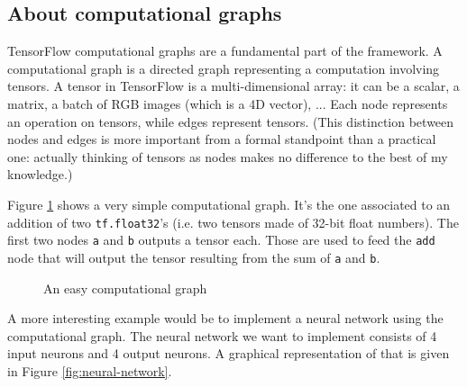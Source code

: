 \subsection{About computational graphs}
\label{subsec:computational-graph}

TensorFlow computational graphs are a fundamental part of the
framework. A computational graph is a directed graph representing a
computation involving tensors. A tensor in TensorFlow is a
multi-dimensional array: it can be a scalar, a matrix, a batch of RGB
images (which is a 4D vector), ... Each node represents an operation on
tensors, while edges represent tensors. (This distinction between nodes
and edges is more important from a formal standpoint than a practical
one: actually thinking of tensors as nodes makes no difference to the
best of my knowledge.)

Figure \ref{fig:easy-graph} shows a very simple computational graph.
It's the one associated to an addition of two \texttt{tf.float32}'s
(i.e. two tensors made of 32-bit float numbers). The first two nodes
\texttt{a} and \texttt{b} outputs a tensor each. Those are used to feed
the \texttt{add} node that will output the tensor resulting from the
sum of \texttt{a} and \texttt{b}.

\begin{figure}[H]
  \centering
  \caption[easy-graph]{An easy computational graph}
  \label{fig:easy-graph}
\end{figure}

A more interesting example would be to implement a neural network using
the computational graph. The neural network we want to implement
consists of 4 input neurons and 4 output neurons. A graphical
representation of that is given in Figure \ref{fig:neural-network}.

